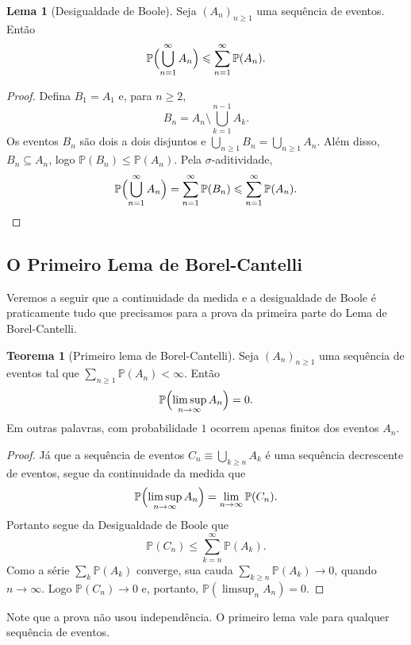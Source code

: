 \documentclass[12pt,portuguese]{article}
\theoremstyle{definition}
\newtheorem{theorem}{Teorema}
\newtheorem{lemma}[lemma]{Lema}
\theoremstyle{plainexercise}
\theoremstyle{starredexercise}
\theoremstyle{definition}
\begin{document}
\begin{lemma}[Desigualdade de Boole]\label{lem:boole}
Seja $(A_n)_{n\geqslant1}$ uma sequência de eventos. Então
\[
\mathbb{P}\Bigl(\bigcup_{n=1}^{\infty}A_n\Bigr)
\leqslant
\sum_{n=1}^{\infty}\mathbb{P}(A_n).
\]
\end{lemma}

\begin{proof}
Defina $B_1=A_1$ e, para $n\geqslant2$,
\[
B_n=A_n\setminus\bigcup_{k=1}^{n-1}A_k.
\]
Os eventos $B_n$ são dois a dois disjuntos e
$\bigcup_{n\geqslant1}B_n=\bigcup_{n\geqslant1}A_n$. Além disso,
$B_n\subseteq A_n$, logo $\mathbb{P}(B_n)\leqslant\mathbb{P}(A_n)$. Pela
$\sigma$-aditividade,
\[
\mathbb{P}\Bigl(\bigcup_{n=1}^{\infty}A_n\Bigr)
=
\sum_{n=1}^{\infty}\mathbb{P}(B_n)
\leqslant
\sum_{n=1}^{\infty}\mathbb{P}(A_n).
\]
\end{proof}

\subsection{O Primeiro Lema de Borel-Cantelli}\label{subsec:bc1}

Veremos a seguir que a continuidade da medida e a desigualdade de Boole
é praticamente tudo que precisamos para a prova da primeira parte do Lema
de Borel-Cantelli.

\begin{theorem}[Primeiro lema de Borel-Cantelli]\label{thm:bc1}
Seja $(A_n)_{n\geqslant1}$ uma sequência de eventos tal que
$\sum_{n\geqslant1}\mathbb{P}(A_n)<\infty$. Então
\[
\mathbb{P}\Bigl(\limsup_{n\to\infty}A_n\Bigr)=0.
\]
Em outras palavras, com probabilidade $1$ ocorrem apenas finitos dos eventos
$A_n$.
\end{theorem}

\begin{proof}
Já que a sequência de eventos $C_n\equiv \bigcup_{k\geqslant n}A_k$
é uma sequência decrescente de eventos, segue da continuidade da medida que 
\[
\mathbb{P}\Bigl(\limsup_{n\to\infty}A_n\Bigr)
=
\lim_{n\to\infty}\mathbb{P}(C_n).
\]
Portanto segue da Desigualdade de Boole  que
\[
\mathbb{P}(C_n)
\leqslant
\sum_{k=n}^{\infty}\mathbb{P}(A_k).
\]
Como a série $\sum_k\mathbb{P}(A_k)$ converge, sua cauda
$\sum_{k\geqslant n}\mathbb{P}(A_k)\to 0$, quando $n\to\infty$. Logo
$\mathbb{P}(C_n)\to0$ e, portanto,
$\mathbb{P}(\limsup_n A_n)=0$.
\end{proof}

Note que a prova não usou independência. O primeiro lema vale para qualquer
sequência de eventos. 
\end{document}
